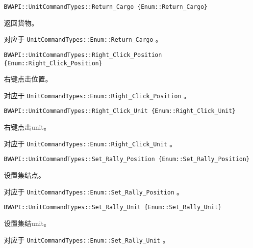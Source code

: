 \begin{tcolorbox}[colback=white, colframe=black!60!white, title=Return\_Cargo\{\}, arc=0mm]
\begin{verbatim}
BWAPI::UnitCommandTypes::Return_Cargo {Enum::Return_Cargo}
\end{verbatim}
返回货物。\par 对应于   \verb|UnitCommandTypes::Enum::Return_Cargo|  。
\end{tcolorbox}


\begin{tcolorbox}[colback=white, colframe=black!60!white, title=Right\_Click\_Position\{\}, arc=0mm]
\begin{verbatim}
BWAPI::UnitCommandTypes::Right_Click_Position {Enum::Right_Click_Position}
\end{verbatim}
右键点击位置。\par 对应于   \verb|UnitCommandTypes::Enum::Right_Click_Position|  。
\end{tcolorbox}


\begin{tcolorbox}[colback=white, colframe=black!60!white, title=Right\_Click\_Unit\{\}, arc=0mm]
\begin{verbatim}
BWAPI::UnitCommandTypes::Right_Click_Unit {Enum::Right_Click_Unit}
\end{verbatim}
右键点击unit。\par 对应于   \verb|UnitCommandTypes::Enum::Right_Click_Unit|  。
\end{tcolorbox}


\begin{tcolorbox}[colback=white, colframe=black!60!white, title=Set\_Rally\_Position\{\}, arc=0mm]
\begin{verbatim}
BWAPI::UnitCommandTypes::Set_Rally_Position {Enum::Set_Rally_Position}
\end{verbatim}
设置集结点。\par 对应于   \verb|UnitCommandTypes::Enum::Set_Rally_Position|  。
\end{tcolorbox}


\begin{tcolorbox}[colback=white, colframe=black!60!white, title=Set\_Rally\_Unit\{\}, arc=0mm]
\begin{verbatim}
BWAPI::UnitCommandTypes::Set_Rally_Unit {Enum::Set_Rally_Unit}
\end{verbatim}
设置集结unit。\par 对应于   \verb|UnitCommandTypes::Enum::Set_Rally_Unit|  。
\end{tcolorbox}


